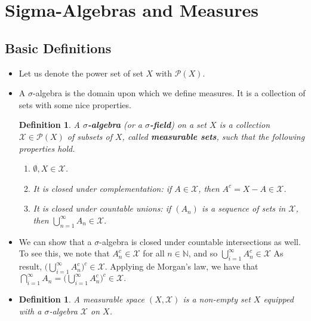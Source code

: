 \documentclass[10pt]{article}
\newtheorem{definition}[lemma]{Definition}
\newcommand{\mcal}[1]{\mathcal{#1}}
\begin{document}
\section{Sigma-Algebras and Measures}

\subsection{Basic Definitions}

\begin{itemize}
  \item Let us denote the power set of set $X$ with $\mcal{P}(X)$.
  
  \item A $\sigma$-algebra is the domain upon which we define measures. It is a collection of sets with some nice properties.
  
  \begin{definition}    
    A {\bf $\sigma$-algebra} (or a {\bf $\sigma$-field}) on a set $X$ is a collection $\mcal{X} \in \mcal{P}(X)$ of subsets of $X$, called {\bf measurable sets}, such that the following properties hold.
    \begin{enumerate}
      \item $\emptyset, X \in \mcal{X}$.
      \item It is closed under complementation: if $A \in \mcal{X}$, then $A^c = X - A \in \mcal{X}$.
      \item It is closed under countable unions: if $(A_n)$ is a sequence of sets in $\mcal{X}$, then $\bigcup_{n=1}^\infty A_n \in \mcal{X}.$
    \end{enumerate}
  \end{definition}

  \item We can show that a $\sigma$-algebra is closed under countable intersections as well. To see this, we note that $A_n^c \in \mcal{X}$ for all $n \in \mathbb{N}$, and so $\bigcup_{i=1}^\infty A_n^c \in \mcal{X}$  
  As result, $\big( \bigcup_{i=1}^\infty A_n^c \big)^c \in \mcal{X}.$
  Applying de Morgan's law, we have that
  $\bigcap_{i=1}^\infty A_n = \big( \bigcup_{i=1}^\infty A_n^c \big)^c  \in \mcal{X}.$  

  \item \begin{definition}
    A measurable space $(X, \mcal{X})$ is a non-empty set $X$ equipped with a $\sigma$-algebra $\mcal{X}$ on $X$.
  \end{definition}  


\end{itemize}
\end{document}
